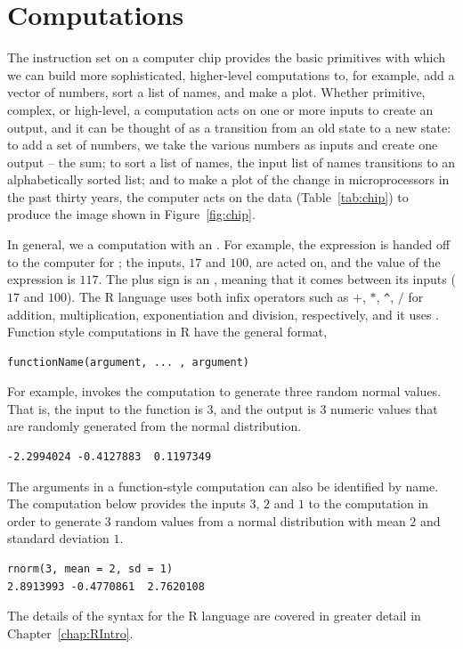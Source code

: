 \section{Computations}\label{sec:computation}
The instruction set on a computer chip provides the basic primitives
with which we can build more sophisticated, higher-level computations
to, for example, add a vector of numbers, sort a list of names, and
make a plot.  Whether primitive, complex, or high-level, a computation
acts on one or more inputs to create an output, and it can be thought
of as a transition from an old state to a new state: to add a set of
numbers, we take the various numbers as inputs and create one output
-- the sum; to sort a list of names, the input list of names
transitions to an alphabetically sorted list; and to make a plot of
the change in microprocessors in the past thirty years, the computer
acts on the data (Table~\ref{tab:chip}) to produce the image shown
in Figure~\ref{fig:chip}.

In general, we  a computation with an
. For example, the expression  is
handed off to the computer for ; the inputs, $17$ and
$100$, are acted on, and the  value of the expression is
$117$.  The plus sign \RCode{+} is an , meaning
that it comes between its inputs ($17$ and $100$).  The R language
uses both infix operators such as $+$, $*$, \verb+^+, $/$ for
addition, multiplication, exponentiation and division, respectively,
and it uses .  Function style
computations in R have the general format,
\begin{verbatim}
functionName(argument, ... , argument)
\end{verbatim}
For example,  invokes the  computation to
generate three random normal values. That is, the input to the
function  is $3$, and the output is $3$ numeric values
that are randomly generated from the normal distribution.
\begin{verbatim}
-2.2994024 -0.4127883  0.1197349
\end{verbatim}

The arguments in a function-style computation can also be identified by
name.  The computation below provides the inputs $3$, $2$ and $1$ to
the computation in order to generate $3$ random values from a normal
distribution with mean $2$ and standard deviation $1$.
\begin{verbatim}
rnorm(3, mean = 2, sd = 1)
2.8913993 -0.4770861  2.7620108
\end{verbatim}
The details of the syntax for the R language are covered in greater
detail in Chapter~\ref{chap:RIntro}.

